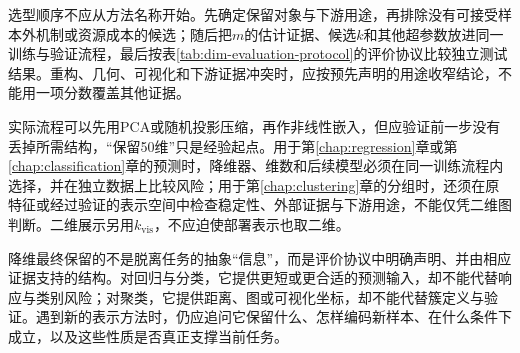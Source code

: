 选型顺序不应从方法名称开始。先确定保留对象与下游用途，再排除没有可接受样本外机制或资源成本的候选；随后把$m$的估计证据、候选$k$和其他超参数放进同一训练与验证流程，最后按表\ref{tab:dim-evaluation-protocol}的评价协议比较独立测试结果。重构、几何、可视化和下游证据冲突时，应按预先声明的用途收窄结论，不能用一项分数覆盖其他证据。

实际流程可以先用PCA或随机投影压缩，再作非线性嵌入，但应验证前一步没有丢掉所需结构，“保留50维”只是经验起点。用于第\ref{chap:regression}章或第\ref{chap:classification}章的预测时，降维器、维数和后续模型必须在同一训练流程内选择，并在独立数据上比较风险；用于第\ref{chap:clustering}章的分组时，还须在原特征或经过验证的表示空间中检查稳定性、外部证据与下游用途，不能仅凭二维图判断。二维展示另用$k_{\mathrm{vis}}$，不应迫使部署表示也取二维。

降维最终保留的不是脱离任务的抽象“信息”，而是评价协议中明确声明、并由相应证据支持的结构。对回归与分类，它提供更短或更合适的预测输入，却不能代替响应与类别风险；对聚类，它提供距离、图或可视化坐标，却不能代替簇定义与验证。遇到新的表示方法时，仍应追问它保留什么、怎样编码新样本、在什么条件下成立，以及这些性质是否真正支撑当前任务。
